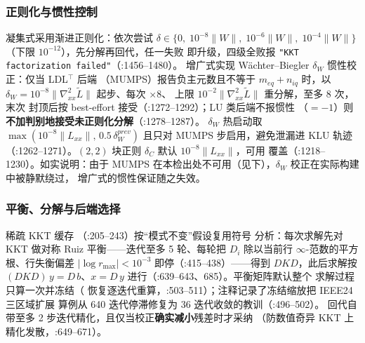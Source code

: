 \subsubsection*{正则化与惯性控制}
凝集式采用渐进正则化：依次尝试
$\delta\in\{0,\;10^{-8}\lVert W\rVert,\;10^{-6}\lVert W\rVert,
\;10^{-4}\lVert W\rVert\}$（下限 $10^{-12}$），先分解再回代，任一失败
即升级，四级全败报 \texttt{"KKT factorization failed"}（:1456--1480）。
增广式实现 Wächter--Biegler $\delta_W$ 惯性校正：仅当 LDL$^{\top}$ 后端
（MUMPS）报告负主元数且不等于 $m_{eq}+n_{iq}$ 时，以
$\delta_W=10^{-8}\lVert\nabla^2_{xx}\tilde L\rVert$ 起步、每次 $\times8$、
上限 $10^{-2}\lVert\nabla^2_{xx}\tilde L\rVert$ 重分解，至多 8 次，末次
封顶后按 best-effort 接受（:1272--1292）；LU 类后端不报惯性
（$=-1$）则\textbf{不加判别地接受未正则化分解}（:1278--1287）。
$\delta_W$ 热启动取 $\max(10^{-8}\lVert L_{xx}\rVert,\,0.5\,\delta_W^{prev})$
且只对 MUMPS 步启用，避免泄漏进 KLU 轨迹（:1262--1271）。$(2,2)$ 块正则
$\delta_C$ 默认 $10^{-8}\lVert L_{xx}\rVert$，可用
 覆盖（:1218--1230）。如实说明：由于
MUMPS 在本检出处不可用（见下），$\delta_W$ 校正在实际构建中被静默绕过，
增广式的惯性保证随之失效。

\subsubsection*{平衡、分解与后端选择}
稀疏 KKT 缓存 （:205--243）按“模式不变”假设复用符号
分析：每次求解先对 KKT 做对称 Ruiz 平衡——迭代至多 5 轮、每轮把
$D_i$ 除以当前行 $\infty$-范数的平方根、行失衡偏差 $|\log r_{\max}|<10^{-3}$
即停（:415--438）——得到 $D\!KD$，此后求解按
$(D\!KD)\,y=D\,b$、$x=D\,y$ 进行（:639--643、685）。平衡矩阵默认整个
求解过程只算一次并冻结（
恢复逐迭代重算，:503--511）；注释记录了冻结缩放把 IEEE24 三区域扩展
算例从 640 迭代停滞修复为 36 迭代收敛的教训（:496--502）。
回代自带至多 2 步迭代精化，且仅当校正\textbf{确实减小}残差时才采纳
（防数值奇异 KKT 上精化发散，:649--671）。

